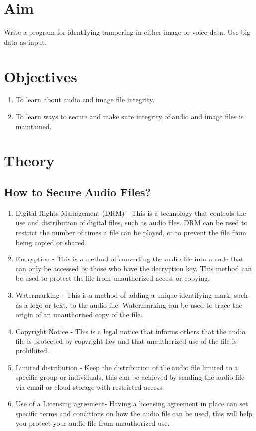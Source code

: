 \documentclass[11pt]{article}
\begin{document}
\tableofcontents
\thispagestyle{empty}
\clearpage

\setcounter{page}{1}

\section{Aim}
Write a program for identifying tampering in either image or voice data. Use big data as input.

\section{Objectives}
\begin{enumerate}
    \item To learn about audio and image file integrity. 
    \item To learn ways to secure and make sure integrity of audio and image files is maintained. 
\end{enumerate}
\section{Theory}

\subsection{How to Secure Audio Files?}

\begin{enumerate}
    \item Digital Rights Management (DRM) - This is a technology that controls the use and distribution of digital files, such as audio files. DRM can be used to restrict the number of times a file can be played, or to prevent the file from being copied or shared.
    \item Encryption - This is a method of converting the audio file into a code that can only be accessed by those who have the decryption key. This method can be used to protect the file from unauthorized access or copying.
    \item Watermarking - This is a method of adding a unique identifying mark, such as a logo or text, to the audio file. Watermarking can be used to trace the origin of an unauthorized copy of the file.
    \item Copyright Notice - This is a legal notice that informs others that the audio file is protected by copyright law and that unauthorized use of the file is prohibited.
    \item Limited distribution - Keep the distribution of the audio file limited to a specific group or individuals, this can be achieved by sending the audio file via email or cloud storage with restricted access.
    \item Use of a Licensing agreement- Having a licensing agreement in place can set specific terms and conditions on how the audio file can be used, this will help you protect your audio file from unauthorized use.
\end{enumerate}
\end{document}
